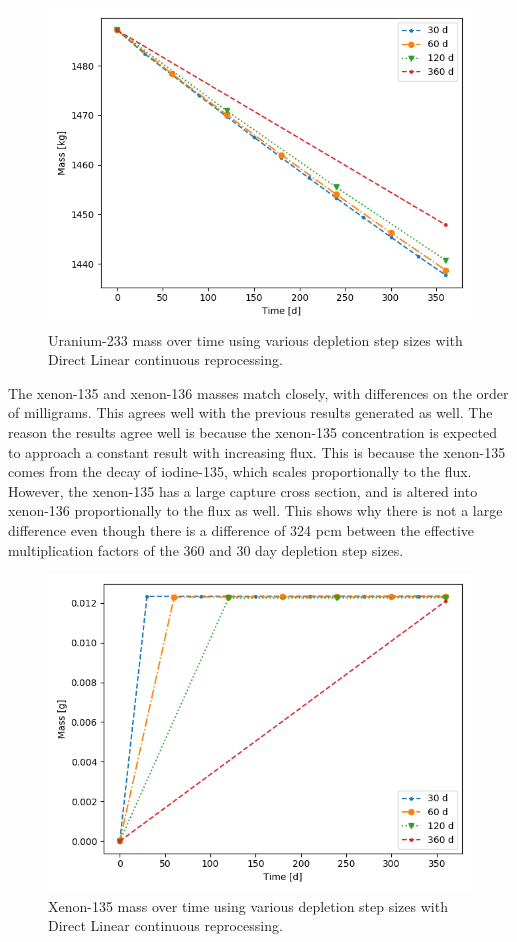 \begin{figure}[H]
  \centering
  \includegraphics[scale=0.7]{images/DL_NSTEP_U-233_mass-large.png}
  \caption{Uranium-233 mass over time using various depletion step sizes with Direct Linear continuous reprocessing.}
   \label{fig:DL-cont-u-2}
\end{figure}

The xenon-135 and xenon-136 masses match closely, with differences on the order of milligrams. This agrees well with the previous results generated as well. The reason the results agree well is because the xenon-135 concentration is expected to approach a constant result with increasing flux. This is because the xenon-135 comes from the decay of iodine-135, which scales proportionally to the flux. However, the xenon-135 has a large capture cross section, and is altered into xenon-136 proportionally to the flux as well. This shows why there is not a large difference even though there is a difference of 324 pcm between the effective multiplication factors of the 360 and 30 day depletion step sizes.

\begin{figure}[H]
  \centering
  \includegraphics[scale=0.7]{images/DL_NSTEP_Xe-135_mass-large.png}
  \caption{Xenon-135 mass over time using various depletion step sizes with Direct Linear continuous reprocessing.}
   \label{fig:DL-cont-xe135-2}
\end{figure}

